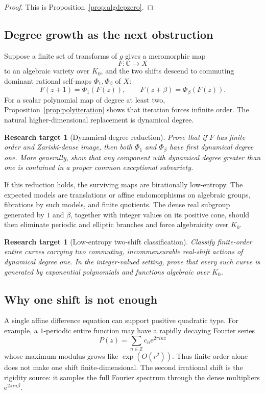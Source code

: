 \documentclass[11pt,oneside]{article}
\newtheorem{target}[theorem]{Research target}
\theoremstyle{definition}
\theoremstyle{remark}
\newcommand{\Z}{\mathbb Z}
\newcommand{\C}{\mathbb C}
\newcommand{\ee}{\mathrm e}
\begin{document}
\begin{proof}
This is Proposition~\ref{prop:algdepzero}.
\end{proof}

\subsection{Degree growth as the next obstruction}

Suppose a finite set of transforms of $g$ gives a meromorphic map
\[
 F:\C\longrightarrow X
\]
to an algebraic variety over $K_0$, and the two shifts descend to commuting dominant
rational self-maps $\Phi_1,\Phi_\beta$ of $X$:
\[
 F(z+1)=\Phi_1(F(z)),
 \qquad
 F(z+\beta)=\Phi_\beta(F(z)).
\]
For a scalar polynomial map of degree at least two,
Proposition~\ref{prop:polyiteration} shows that iteration forces infinite order.  The
natural higher-dimensional replacement is dynamical degree.

\begin{target}[Dynamical-degree reduction]
\label{target:dynamicaldegree}
Prove that if $F$ has finite order and Zariski-dense image, then both
$\Phi_1$ and $\Phi_\beta$ have first dynamical degree one.  More generally, show that any
component with dynamical degree greater than one is contained in a proper common exceptional
subvariety.
\end{target}

If this reduction holds, the surviving maps are birationally low-entropy.  The expected
models are translations or affine endomorphisms on algebraic groups, fibrations by such
models, and finite quotients.  The dense real subgroup generated by $1$ and $\beta$, together
with integer values on its positive cone, should then eliminate periodic and elliptic
branches and force algebraicity over $K_0$.

\begin{target}[Low-entropy two-shift classification]
\label{target:lowentropy}
Classify finite-order entire curves carrying two commuting, incommensurable real-shift
actions of dynamical degree one.  In the integer-valued setting, prove that every such curve
is generated by exponential polynomials and functions algebraic over $K_0$.
\end{target}

\subsection{Why one shift is not enough}

A single affine difference equation can support positive quadratic type.  For example, a
$1$-periodic entire function may have a rapidly decaying Fourier series
\[
 P(z)=\sum_{n\in\Z}c_n\ee^{2\pi i n z}
\]
whose maximum modulus grows like $\exp(O(r^2))$.  Thus finite order alone does not make one
shift finite-dimensional.  The second irrational shift is the rigidity source: it samples
the full Fourier spectrum through the dense multipliers $\ee^{2\pi i n\beta}$.
\end{document}
